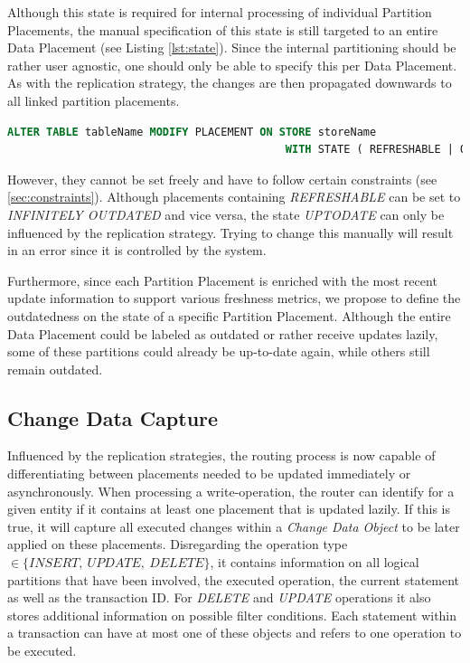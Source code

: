 Although this state is required for internal processing of individual Partition Placements, the manual specification of this state is still 
targeted to an entire Data Placement (see Listing \ref{lst:state}).
Since the internal partitioning should be rather user agnostic, one should only be able to specify this per Data Placement. 
As with the replication strategy, the changes are then propagated downwards to all linked partition placements.

\begin{lstlisting}[language=sql, caption={SQL Statement Syntax to change the designated Replication State of Data Placement.},label={lst:state}]
    ALTER TABLE tableName MODIFY PLACEMENT ON STORE storeName 
                                           WITH STATE ( REFRESHABLE | OUTDATED );
\end{lstlisting}

However, they cannot be set freely and have to follow certain constraints (see \ref{sec:constraints}).
Although placements containing \emph{REFRESHABLE} can be set to \emph{INFINITELY OUTDATED} and vice versa, the state \emph{UPTODATE} can only be influenced by the replication strategy.
Trying to change this manually will result in an error since it is controlled by the system.



Furthermore, since each Partition Placement is enriched with the most recent update information to support various freshness metrics,
we propose to define the outdatedness on the state of a specific Partition Placement.
Although the entire Data Placement could be labeled as outdated or rather receive updates lazily, some of 
these partitions could already be up-to-date again, while others still remain outdated.



\subsection{Change Data Capture}
\label{sec:cdc_impl}

Influenced by the replication strategies, the routing process is now capable of differentiating between placements needed to be updated immediately or asynchronously. 
When processing a write-operation, the router can identify for a given entity if it contains at least one placement that is updated lazily.
If this is true, it will capture all executed changes within a \emph{Change Data Object} to be later applied on these placements. 
Disregarding the operation type $\in \{INSERT,\:UPDATE,\:DELETE\}$, it contains information on all logical partitions that have been involved, 
the executed operation, the current statement as well as the transaction ID. For \emph{DELETE} and \emph{UPDATE} operations it also stores additional information on possible filter 
conditions. Each statement within a transaction can have at most one of these objects and refers to one operation to be executed.

